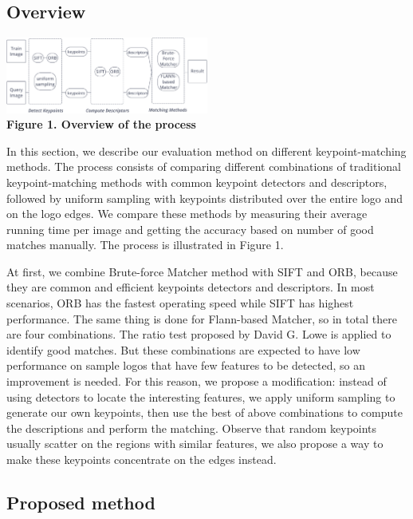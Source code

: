 \documentclass[letterpaper, 10 pt, conference]{ieeeconf}  %
\begin{document}
\subsection{Overview}
\begin{center}
\includegraphics[width=0.5\textwidth]{quytrinhv.pdf} \\
\textbf{Figure 1. Overview of the process} \textit{}
\end{center}
\par
In this section, we describe our evaluation method on different keypoint-matching methods. The process consists of comparing different combinations of traditional keypoint-matching methods with common keypoint detectors and descriptors, followed by uniform sampling with keypoints distributed over the entire logo and on the logo edges. We compare these methods by measuring their average running time per image and getting the accuracy based on number of good matches manually. The process is illustrated in Figure 1.\par
At first, we combine Brute-force Matcher method with SIFT\cite{sift} and ORB\cite{orb}, because they are common and efficient keypoints detectors and descriptors. In most scenarios, ORB has the fastest operating speed while SIFT has highest performance. The same thing is done for Flann-based Matcher\cite{flann}, so in total there are four combinations. The ratio test proposed by David G. Lowe is applied to identify good matches\cite{sift}. But these combinations are expected to have low performance on sample logos that have few features to be detected, so an improvement is needed. For this reason, we propose a modification: instead of using detectors to locate the interesting features, we apply uniform sampling to generate our own keypoints, then use the best of above combinations to compute the descriptions and perform the matching. Observe that random keypoints usually scatter on the regions with similar features, we also propose a way to make these keypoints concentrate on the edges instead.
\subsection{Proposed method}
\end{document}
